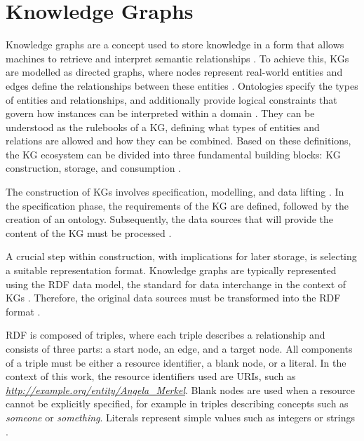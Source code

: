 \documentclass[a4paper,oneside,bibliography=totoc]{scrbook}
\begin{document}
\section{Knowledge Graphs}
\label{sec:knowledge_graphs}

Knowledge graphs are a concept used to store knowledge in a form that allows machines to retrieve and interpret semantic relationships \cite{GomezPerez2017}. To achieve this, \acp{KG} are modelled as directed graphs, where nodes represent real-world entities and edges define the relationships between these entities \cite{Paulheim2016}. Ontologies specify the types of entities and relationships, and additionally provide logical constraints that govern how instances can be interpreted within a domain \cite{GomezPerez2017,Paulheim2016}. They can be understood as the rulebooks of a \ac{KG}, defining what types of entities and relations are allowed and how they can be combined. Based on these definitions, the \ac{KG} ecosystem can be divided into three fundamental building blocks: \ac{KG} construction, storage, and consumption \cite{GomezPerez2017}.

The construction of \acp{KG} involves specification, modelling, and data lifting \cite{VillazonTerrazas2017}. In the specification phase, the requirements of the \ac{KG} are defined, followed by the creation of an ontology. Subsequently, the data sources that will provide the content of the \ac{KG} must be processed \cite{VillazonTerrazas2017}.

A crucial step within construction, with implications for later storage, is selecting a suitable representation format. Knowledge graphs are typically represented using the \ac{RDF} data model, the standard for data interchange in the context of \acp{KG} \cite{VillazonTerrazas2017a}. Therefore, the original data sources must be transformed into the \ac{RDF} format \cite{VillazonTerrazas2017a}.

\Ac{RDF} is composed of triples, where each triple describes a relationship and consists of three parts: a start node, an edge, and a target node. All components of a triple must be either a resource identifier, a blank node, or a literal. In the context of this work, the resource identifiers used are \acp{URI}, such as \textit{\url{http://example.org/entity/Angela_Merkel}}. Blank nodes are used when a resource cannot be explicitly specified, for example in triples describing concepts such as \textit{someone} or \textit{something}. Literals represent simple values such as integers or strings \cite{VillazonTerrazas2017a}.
\end{document}
